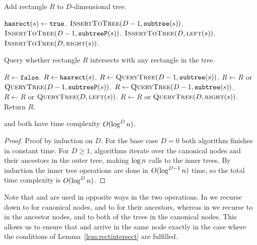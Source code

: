 \documentclass[english,gradu]{tktltiki2018}
\begin{document}
\begin{alg}\label{alg:rectadd}
Add rectangle $R$ to $D$-dimensional tree.
\begin{algorithmic}
		\State $\texttt{hasrect}(s)\gets\texttt{true}$.
		\State $\textsc{InsertToTree}(D-1,\texttt{subtree}(s))$.
		\State $\textsc{InsertToTree}(D-1,\texttt{subtreeP}(s))$.
		\State $\textsc{InsertToTree}(D,\textsc{left}(s))$.
		\State $\textsc{InsertToTree}(D,\textsc{right}(s))$.
	\EndIf
\EndProcedure
\end{algorithmic}
\end{alg}

\begin{alg}\label{alg:rectcheck}
Query whether rectangle $R$ intersects with any rectangle in the tree.
\begin{algorithmic}
	\State $R\gets\texttt{false}$.
		\State $R\gets\texttt{hasrect}(s)$.
		\State $R\gets \textsc{QueryTree}(D-1,\texttt{subtree}(s))$.
		\State $R\gets R$ or $\textsc{QueryTree}(D-1,\texttt{subtreeP}(s))$.
		\State $R\gets \textsc{QueryTree}(D-1,\texttt{subtree}(s))$.
		\State $R\gets R$ or $\textsc{QueryTree}(D,\textsc{left}(s))$.
		\State $R\gets R$ or $\textsc{QueryTree}(D,\textsc{right}(s))$.
	\EndIf
	\State Return $R$.
\EndProcedure
\end{algorithmic}
\end{alg}

\begin{lem}\adddt and \checkdt both have time complexity $O(\log^Dn)$.\end{lem}
\begin{proof}
Proof by induction on $D$.
For the base case $D=0$ both algorithm finishes in constant time.
For $D\ge 1$, algorithms iterate over the canonical nodes and their ancestors in the outer tree, making $\log n$ calls to the inner trees.
By induction the inner tree operations are done in $O(\log^{D-1}n)$ time, so the total time complexity is $O(\log^Dn)$.
\end{proof}

Note that \subtree{} and \subtreep{} are used in opposite ways in the two operations.
In \adddt{} we recurse down to \subtree{} for canonical nodes, and to \subtreep{} for their ancestors, whereas in \checkdt{} we recurse to \subtree{} in the ancestor nodes, and to both of the trees in the canonical nodes.
This allows us to ensure that \adddt{} and \checkdt{} arrive in the same node exactly in the case where the conditions of Lemma~\ref{lem:rectintersect} are fulfilled.
\end{document}
